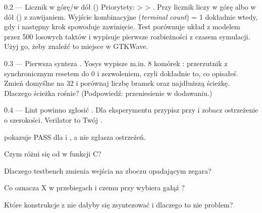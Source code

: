 \begin{zadanie}{0.2 --- Licznik w górę/w dół ()}
Priorytety:  >  > . Przy  licznik
liczy w górę albo w dół () z zawijaniem. Wyjście kombinacyjne
 (\emph{terminal count}) = 1 dokładnie wtedy, gdy  i
następny krok spowoduje zawinięcie. Test porównuje układ z modelem przez 500
losowych taktów i wypisuje pierwsze rozbieżności z czasem symulacji. Użyj go,
żeby znaleźć to miejsce w GTKWave.
\end{zadanie}

\begin{zadanie}{0.3 --- Pierwsza synteza}
. Yosys wypisze m.in. 8 komórek
: przerzutnik z synchronicznym resetem do 0 i
zezwoleniem, czyli dokładnie to, co opisałeś. Zmień domyślne
 na 32 i porównaj liczbę bramek oraz najdłuższą ścieżkę. Dlaczego
ścieżka rośnie? (Podpowiedź: przeniesienie w dodawaniu.)
\end{zadanie}

\begin{zadanie}{0.4 --- Lint}
 powinno zgłosić . Dla eksperymentu przypisz
 przy  i zobacz ostrzeżenie o
szerokości. Verilator to Twój .
\end{zadanie}

\begin{gotowe}
 pokazuje PASS dla  i , a  nie zgłasza ostrzeżeń.
\end{gotowe}

\begin{kontrolne}
  \item Czym różni się  od  w funkcji C?
  \item Dlaczego testbench zmienia wejścia na zboczu opadającym zegara?
  \item Co oznacza X w przebiegach i czemu  przy  wybiera gałąź ?
  \item Które konstrukcje z  nie dałyby się zsyntezować i dlaczego to nie problem?
\end{kontrolne}
